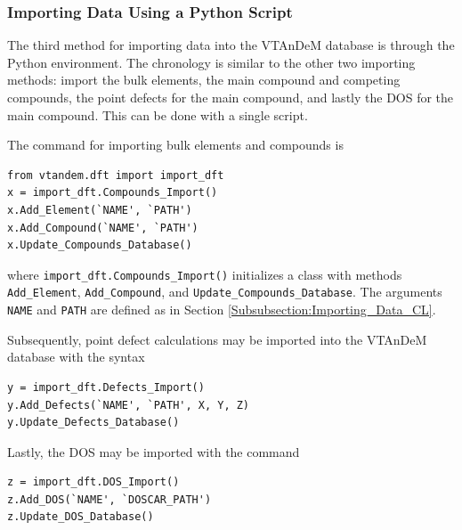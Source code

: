 \documentclass[%
 reprint,
 amsmath,amssymb,
 aps,
]{revtex4-1}
\begin{document}
\subsubsection{Importing Data Using a Python Script} \label{Subsubsection:Importing_Data_Python}

The third method for importing data into the VTAnDeM database is through the Python environment. The chronology is similar to the other two importing methods: import the bulk elements, the main compound and competing compounds, the point defects for the main compound, and lastly the DOS for the main compound. This can be done with a single script.

The command for importing bulk elements and compounds is
\begin{verbatim}
from vtandem.dft import import_dft
x = import_dft.Compounds_Import()
x.Add_Element(`NAME', `PATH')
x.Add_Compound(`NAME', `PATH')
x.Update_Compounds_Database()
\end{verbatim}
where \verb+import_dft.Compounds_Import()+ initializes a class with methods \verb+Add_Element+, \verb+Add_Compound+, and \verb+Update_Compounds_Database+. The arguments \verb+NAME+ and \verb+PATH+ are defined as in Section \ref{Subsubsection:Importing_Data_CL}.

Subsequently, point defect calculations may be imported into the VTAnDeM database with the syntax
\begin{verbatim}
y = import_dft.Defects_Import()
y.Add_Defects(`NAME', `PATH', X, Y, Z) 
y.Update_Defects_Database()
\end{verbatim}

Lastly, the DOS may be imported with the command
\begin{verbatim}
z = import_dft.DOS_Import()
z.Add_DOS(`NAME', `DOSCAR_PATH')
z.Update_DOS_Database()
\end{verbatim}





\end{document}
